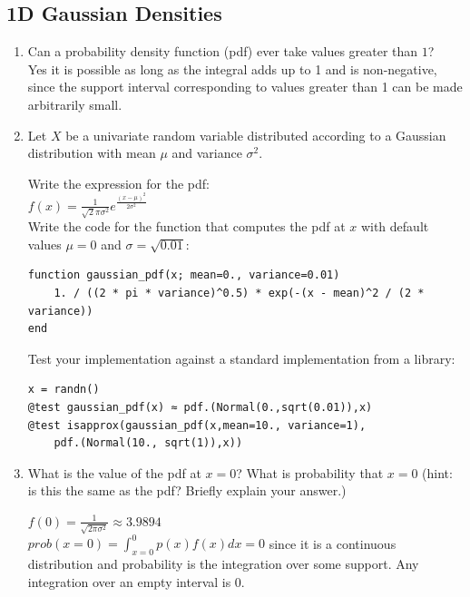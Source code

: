 \documentclass[12pt,letter]{article}
\begin{document}
\subsection{1D Gaussian Densities}

\begin{enumerate}
\item Can a probability density function (pdf) ever take values greater than $1$?\\
  
  Yes it is possible as long as the integral adds up to 1 and is non-negative, since the support interval corresponding to values greater than 1 can be made arbitrarily small.\\
  
  \item Let $X$ be a univariate random variable distributed according to a Gaussian distribution with mean $\mu$ and variance $\sigma^2$.

    Write the expression for the pdf:\\

    $f(x) = \frac{1}{\sqrt 2\pi\sigma^2} e^{\frac{(x-\mu)^2}{2\sigma^2}}$\\

    Write the code for the function that computes the pdf at $x$ with default values $\mu=0$ and $\sigma = \sqrt{0.01}$:\\

\begin{verbatim}
function gaussian_pdf(x; mean=0., variance=0.01)
    1. / ((2 * pi * variance)^0.5) * exp(-(x - mean)^2 / (2 * variance))
end
\end{verbatim}

    Test your implementation against a standard implementation from a library:
    
\begin{verbatim}
x = randn()
@test gaussian_pdf(x) ≈ pdf.(Normal(0.,sqrt(0.01)),x)
@test isapprox(gaussian_pdf(x,mean=10., variance=1), 
    pdf.(Normal(10., sqrt(1)),x))
\end{verbatim}

    \item What is the value of the pdf at $x=0$? What is probability that $x=0$ (hint: is this the same as the pdf? Briefly explain your answer.)

      $f(0)=\frac{1}{\sqrt{2 \pi \sigma^2}} \approx 3.9894$\\
      $prob(x=0)=\int_{x=0}^{0}p(x)f(x) dx = 0$ since it is a continuous distribution and probability is the integration over some support. Any integration over an empty interval is 0.\\


\end{enumerate}
\end{document}
